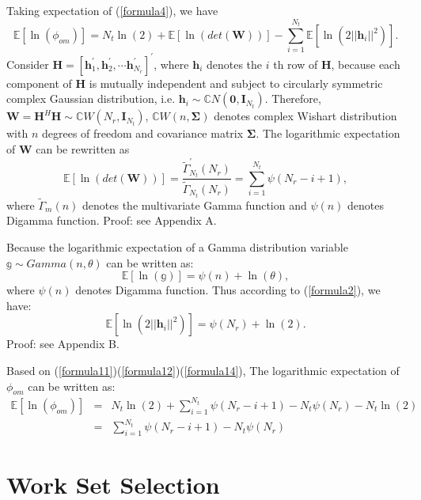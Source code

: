 \documentclass[12pt, draftclsnofoot, onecolumn]{IEEEtran}
\begin{document}
Taking expectation of (\ref{formula4}), we have 
\begin{equation}
\mathbb{E}[\ln(\phi_{om})]=N_{t}\ln(2)+\mathbb{E}[\ln(det(\mathbf{W}))]-\sum_{i=1}^{N_{t}}\mathbb{E}[\ln(2||\mathbf{h}_{i}||^{2})].
\label{formula11}
\end{equation}
Consider $\mathbf{H}=[\mathbf{h}_{1}^{'},\mathbf{h}_{2}^{'},\cdots \mathbf{h}_{N_{r}}^{'}]^{'}$, where $\mathbf{h}_{i}$ denotes the $i$ th row of $\mathbf{H}$, because each component of $\mathbf{H}$ is mutually independent and subject to circularly symmetric complex Gaussian distribution, i.e. $\mathbf{h}_{i}\sim \mathbb{C}N(\mathbf{0},\mathbf{I}_{N_{t}})$. Therefore, $\mathbf{W}=\mathbf{H}^{H}\mathbf{H}\sim \mathbb{C}W(N_{r}, \mathbf{I}_{N_{t}})$, $\mathbb{C}W(n,\mathbf{\Sigma})$ denotes complex Wishart distribution with $n$ degrees of freedom and covariance matrix $\mathbf{\Sigma}$. The logarithmic expectation of $\mathbf{W}$ can be rewritten as
\begin{equation}
\mathbb{E}[\ln(det(\mathbf{W}))]=\frac{\tilde{\Gamma}^{'}_{N_{t}}(N_{r})}{\tilde{\Gamma}_{N_{t}}(N_{r})}=\sum_{i=1}^{N_{t}}\psi(N_{r}-i+1),
\label{formula12}
\end{equation}
where $\tilde{\Gamma}_{m}(n)$ denotes the multivariate Gamma function and $\psi(n)$ denotes Digamma function. Proof: see Appendix A.

Because the logarithmic expectation of a Gamma distribution variable $\mathbb{g}\sim Gamma(n,\theta)$ can be written as:
\begin{equation}
\mathbb{E}[\ln(\mathbb{g})]=\psi(n)+\ln(\theta),
\end{equation}
where $\psi(n)$ denotes Digamma function. Thus according to (\ref{formula2}), we have:
\begin{equation}
\mathbb{E}[\ln(2||\mathbf{h}_{i}||^{2})]=\psi(N_{r})+\ln(2).
\label{formula14}
\end{equation}
Proof: see Appendix B.

Based on (\ref{formula11})(\ref{formula12})(\ref{formula14}), The logarithmic expectation of $\phi_{om}$ can be written as:
\begin{eqnarray}
\nonumber
\mathbb{E}[\ln(\phi_{om})]&=&N_{t}\ln(2)+\sum_{i=1}^{N_{t}}\psi(N_{r}-i+1)-N_{t}\psi(N_{r})-N_{t}\ln(2)\\
&=& \sum_{i=1}^{N_{t}}\psi(N_{r}-i+1)-N_{t}\psi(N_{r})
\label{formula15}
\end{eqnarray}
\section{Work Set Selection}\label{WSS}
\end{document}
